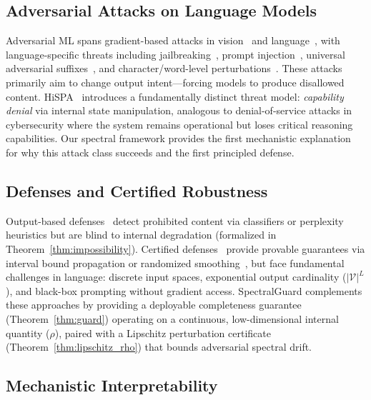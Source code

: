 \documentclass[10pt,twocolumn]{article}
\begin{document}
\subsection{Adversarial Attacks on Language Models}

Adversarial ML spans gradient-based attacks in vision~\cite{goodfellow2014adversarial,madry2018towards} and language~\cite{wallace2019universal,zou2023universal}, with language-specific threats including jailbreaking~\cite{liu2023jailbreak,wei2023jailbroken}, prompt injection~\cite{perez2022red,greshake2023not}, universal adversarial suffixes~\cite{zou2023universal}, and character/word-level perturbations~\cite{ebrahimi2018hotflip,gao2018black}. These attacks primarily aim to change output intent---forcing models to produce disallowed content. HiSPA~\cite{lemercier2026hispa} introduces a fundamentally distinct threat model: \emph{capability denial} via internal state manipulation, analogous to denial-of-service attacks in cybersecurity where the system remains operational but loses critical reasoning capabilities. Our spectral framework provides the first mechanistic explanation for why this attack class succeeds and the first principled defense.

\subsection{Defenses and Certified Robustness}

Output-based defenses~\cite{helbling2023llm,jain2023baseline} detect prohibited content via classifiers or perplexity heuristics but are blind to internal degradation (formalized in Theorem~\ref{thm:impossibility}). Certified defenses~\cite{jia2019certified,huang2019achieving} provide provable guarantees via interval bound propagation or randomized smoothing~\cite{cohen2019certified}, but face fundamental challenges in language: discrete input spaces, exponential output cardinality ($|\mathcal{V}|^L$), and black-box prompting without gradient access. SpectralGuard complements these approaches by providing a deployable completeness guarantee (Theorem~\ref{thm:guard}) operating on a continuous, low-dimensional internal quantity ($\rho$), paired with a Lipschitz perturbation certificate (Theorem~\ref{thm:lipschitz_rho}) that bounds adversarial spectral drift.

\subsection{Mechanistic Interpretability}
\end{document}
